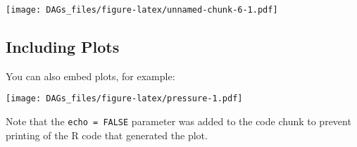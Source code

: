 \documentclass[
]{article}
\begin{document}
\texttt{[image: DAGs\_files/figure-latex/unnamed-chunk-6-1.pdf]}

\hypertarget{including-plots}{%
\subsection{Including Plots}\label{including-plots}}

You can also embed plots, for example:

\texttt{[image: DAGs\_files/figure-latex/pressure-1.pdf]}

Note that the \texttt{echo\ =\ FALSE} parameter was added to the code
chunk to prevent printing of the R code that generated the plot.
\end{document}
